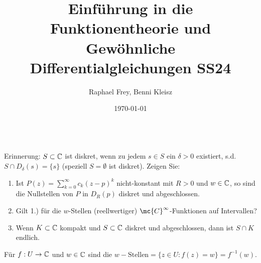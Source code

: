 \documentclass[ngerman]{report}
\title{Einführung in die Funktionentheorie und Gewöhnliche Differentialgleichungen SS24}
\author{Raphael Frey, Benni Kleisz}
\institute{Universität Tübingen}
\date{\today}
\begin{document}
\begin{question}\hspace{\linewidth}\\
    Erinnerung: $S \subset \mathbb{C}$ ist diskret, wenn zu jedem $s \in S$ ein $\delta > 0$ existiert, s.d. $S\cap D_\delta(s) = \{s\}$ (speziell $S = \emptyset$ ist diskret). Zeigen Sie:
    \begin{enumerate}
        \item Ist $P(z) = \sum_{k=0}^\infty c_k(z-p)^k$ nicht-konstant mit $R>0$ und $w \in \mathbb{C}$, so sind die Nullstellen von $P$ in $D_R(p)$ diskret und abgeschlossen.
        \item Gilt 1.) für die $w$-Stellen (reellwertiger) $\mc{C}^\infty$-Funktionen auf Intervallen?
        \item Wenn $K \subset \mathbb{C}$ kompakt und $S \subset \mathbb{C}$ diskret und abgeschlossen, dann ist $S \cap K$ endlich.
    \end{enumerate}
    Für $f:U\to \mathbb{C}$ und $w\in \mathbb{C}$ sind die $w-\text{Stellen}=\{z\in U: f(z)=w\}=f^{-1}(w)$.    
\end{question}
\end{document}
